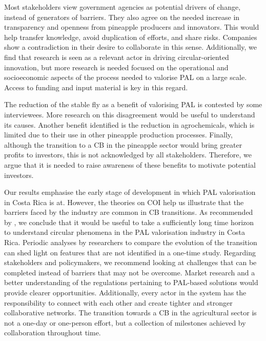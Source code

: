 Most stakeholders view government agencies as potential drivers of change, instead of generators of barriers. They also agree on the needed increase in transparency and openness from pineapple producers and innovators. This would help transfer knowledge, avoid duplication of efforts, and share risks. Companies show a contradiction in their desire to collaborate in this sense. Additionally, we find that research is seen as a relevant actor in driving circular-oriented innovation, but more research is needed focused on the operational and socioeconomic aspects of the process needed to valorise PAL on a large scale. Access to funding and input material is key in this regard.

The reduction of the stable fly as a benefit of valorising PAL is contested by some interviewees. More research on this disagreement would be useful to understand its causes. Another benefit identified is the reduction in agrochemicals, which is limited due to their use in other pineapple production processes. Finally, although the transition to a CB in the pineapple sector would bring greater profits to investors, this is not acknowledged by all stakeholders. Therefore, we argue that it is needed to raise awareness of these benefits to motivate potential investors. 

Our results emphasise the early stage of development in which PAL valorisation in Costa Rica is at. However, the theories on COI help us illustrate that the barriers faced by the industry are common in CB transitions. As recommended by \cite{blomsma2022making}, we conclude that it would be useful to take a sufficiently long time horizon to understand circular phenomena in the PAL valorisation industry in Costa Rica. Periodic analyses by researchers to compare the evolution of the transition can shed light on features that are not identified in a one-time study. Regarding stakeholders and policymakers, we recommend looking at challenges that can be completed instead of barriers that may not be overcome. Market research and a better understanding of the regulations pertaining to PAL-based solutions would provide clearer opportunities. Additionally, every actor in the system has the responsibility to connect with each other and create tighter and stronger collaborative networks. The transition towards a CB in the agricultural sector is not a one-day or one-person effort, but a collection of milestones achieved by collaboration throughout time. 


